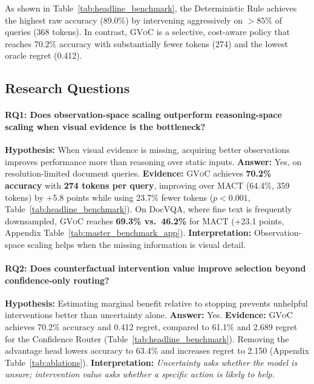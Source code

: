 \documentclass[11pt]{article}
\begin{document}
As shown in Table~\ref{tab:headline_benchmark}, the Deterministic Rule achieves the highest raw accuracy (89.0\%) by intervening aggressively on $>85\%$ of queries (368 tokens). In contrast, \textsc{GVoC} is a selective, cost-aware policy that reaches 70.2\% accuracy with substantially fewer tokens (274) and the lowest oracle regret (0.412).

\subsection{Research Questions}

\paragraph{RQ1: Does observation-space scaling outperform reasoning-space scaling when visual evidence is the bottleneck?}
\textbf{Hypothesis:} When visual evidence is missing, acquiring better observations improves performance more than reasoning over static inputs.
\textbf{Answer:} Yes, on resolution-limited document queries.
\textbf{Evidence:} \textsc{GVoC} achieves \textbf{70.2\% accuracy} with \textbf{274 tokens per query}, improving over MACT (64.4\%, 359 tokens) by +5.8 points while using 23.7\% fewer tokens ($p < 0.001$, Table~\ref{tab:headline_benchmark}). On DocVQA, where fine text is frequently downsampled, \textsc{GVoC} reaches \textbf{69.3\% vs.\ 46.2\%} for MACT (+23.1 points, Appendix Table~\ref{tab:master_benchmark_app}).
\textbf{Interpretation:} Observation-space scaling helps when the missing information is visual detail.

\paragraph{RQ2: Does counterfactual intervention value improve selection beyond confidence-only routing?}
\textbf{Hypothesis:} Estimating marginal benefit relative to stopping prevents unhelpful interventions better than uncertainty alone.
\textbf{Answer:} Yes.
\textbf{Evidence:} \textsc{GVoC} achieves 70.2\% accuracy and 0.412 regret, compared to 61.1\% and 2.689 regret for the Confidence Router (Table~\ref{tab:headline_benchmark}). Removing the advantage head lowers accuracy to 63.4\% and increases regret to 2.150 (Appendix Table~\ref{tab:ablations}).
\textbf{Interpretation:} \textit{Uncertainty asks whether the model is unsure; intervention value asks whether a specific action is likely to help.}
\end{document}
